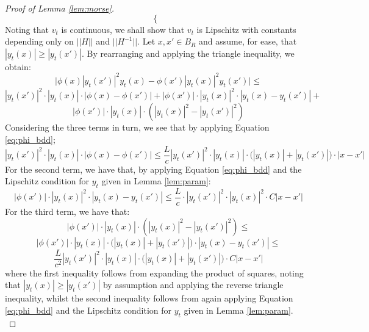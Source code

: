 \documentclass[11pt]{article}
\newcommand{\1}{\mathbf{1}}
\theoremstyle{definition}
\theoremstyle{remark}
\begin{document}
\begin{proof}[Proof of Lemma \ref{lem:morse}]
\begin{equation}
\begin{cases}
    \end{cases}
\end{equation}
Noting that $v_t$ is continuous, we shall show that $v_t$ is Lipschitz with constants depending only on $||H||$ and $||H^{-1}||$. Let $x,x'\in B_R$ and assume, for ease, that $|y_t(x)|\geq |y_t(x')|$. By rearranging and applying the triangle inequality, we obtain:
\begin{equation}\nonumber
        \bigg|\phi(x)|y_t(x')|^2 y_t(x)-\phi(x')|y_t(x)|^2 y_t(x')\bigg| \leq 
\end{equation}
\begin{equation}\nonumber
        |y_t(x')|^2 \cdot|y_t(x)| \cdot|\phi(x)-\phi(x')| + |\phi(x')|\cdot |y_t(x)|^2 \cdot |y_t(x)-y_t(x')| +
\end{equation}
\begin{equation}\label{eq:big_ineq}
        |\phi(x')|\cdot |y_t(x)| \cdot (|y_t(x)|^2-|y_t(x')|^2) 
\end{equation}
Considering the three terms in turn, we see that by applying Equation \eqref{eq:phi_bdd};
\begin{equation}\label{eq:term1}
    |y_t(x')|^2 \cdot|y_t(x)| \cdot|\phi(x)-\phi(x')| \leq \frac{L}{c}|y_t(x')|^2 \cdot|y_t(x)| \cdot\bigg(|y_t(x)|+|y_t(x')|\bigg)\cdot |x-x'|
\end{equation}
For the second term, we have that, by applying Equation \eqref{eq:phi_bdd} and the Lipschitz condition for $y_t$ given in Lemma \ref{lem:param}:
\begin{equation}\label{eq:term2}
    |\phi(x')|\cdot |y_t(x)|^2 \cdot |y_t(x)-y_t(x')| \leq \frac{L}{c}\cdot |y_t(x')|^2\cdot |y_t(x)|^2 \cdot C|x-x'|
\end{equation}
For the third term, we have that:
\begin{equation}\nonumber
        |\phi(x')|\cdot |y_t(x)| \cdot (|y_t(x)|^2-|y_t(x')|^2) \leq 
\end{equation}
\begin{equation}\nonumber
         |\phi(x')|\cdot |y_t(x)| \cdot \bigg(|y_t(x)| + |y_t(x')|\bigg) \cdot |y_t(x)-y_t(x')|  \leq 
\end{equation}
\begin{equation}\label{eq:term3}
         \frac{L}{c^2}|y_t(x')|^2\cdot |y_t(x)| \cdot \bigg(|y_t(x)| + |y_t(x')|\bigg) \cdot C|x-x'|
\end{equation}
where the first inequality follows from expanding the product of squares, noting that $|y_t(x)|\geq |y_t(x')|$ by assumption and applying the reverse triangle inequality, whilst the second inequality follows from again applying Equation \eqref{eq:phi_bdd} and the Lipschitz condition for $y_t$ given in Lemma \ref{lem:param}.\\

\end{proof}
\end{document}
